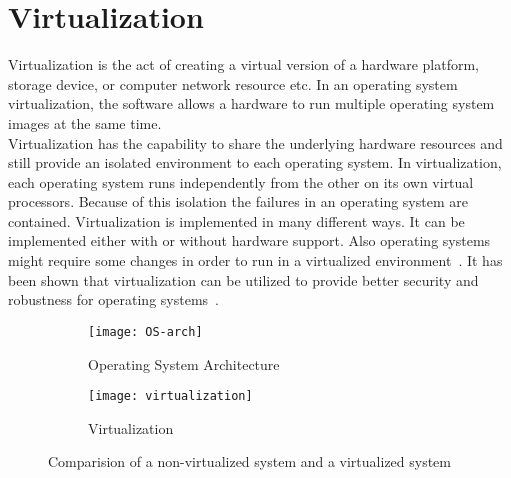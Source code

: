 \section{Virtualization}
Virtualization is the act of creating a virtual version of a hardware platform, storage device, or computer network resource etc. In an operating system virtualization, the software allows a hardware to run multiple operating system images at the same time.
\\[3mm]
Virtualization has the capability to share the underlying hardware resources and still provide an isolated environment to each operating system. In virtualization, each operating system runs independently from the other on its own virtual processors. Because of this isolation the failures in an operating system are contained. Virtualization is implemented in many different ways. It can be implemented either with or without hardware support. Also operating systems might require some changes in order to run in a virtualized environment~\cite{Drepper:2008:CV:1348583.1348591}. It has been shown that virtualization can be utilized to provide better security and robustness for operating systems~\cite{Fraser04safehardware, LeVasseur04UnmodifiedDriverReuse, Riley:2008:GPK:1433006.1433008}.
\begin{figure}[!ht]
    \centering
    \begin{subfigure}[b]{0.49\textwidth}
	\texttt{[image: OS-arch]}
	\caption{Operating System Architecture}
	\label{fig:OS}
    \end{subfigure}
	\hfill
    \begin{subfigure}[b]{0.49\textwidth}
	\texttt{[image: virtualization]}
	\caption{Virtualization}
	\label{fig:Virtualization}
	\end{subfigure}
    \caption{Comparision of a non-virtualized system and a virtualized system}\label{fig:Kernel space}
\end{figure}

